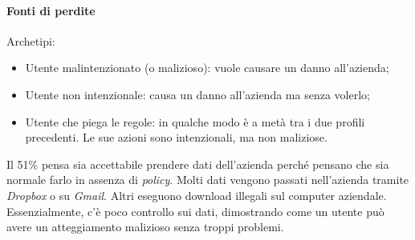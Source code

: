 \paragraph*{Fonti di perdite}

Archetipi:
\begin{itemize}
\item Utente malintenzionato (o malizioso): vuole causare un danno all'azienda;
\item Utente non intenzionale: causa un danno all'azienda ma senza volerlo;
\item Utente che piega le regole: in qualche modo è a metà tra i due profili
precedenti. Le sue azioni sono intenzionali, ma non maliziose.
\end{itemize}

Il 51\% pensa sia accettabile prendere dati dell'azienda perché pensano che sia
normale farlo in assenza di \textit{policy}. Molti dati vengono passati
nell'azienda tramite \textit{Dropbox} o su \textit{Gmail}. Altri eseguono
download illegali sul computer aziendale. Essenzialmente, c'è poco controllo
sui dati, dimostrando come un utente può avere un atteggiamento malizioso senza
troppi problemi.
